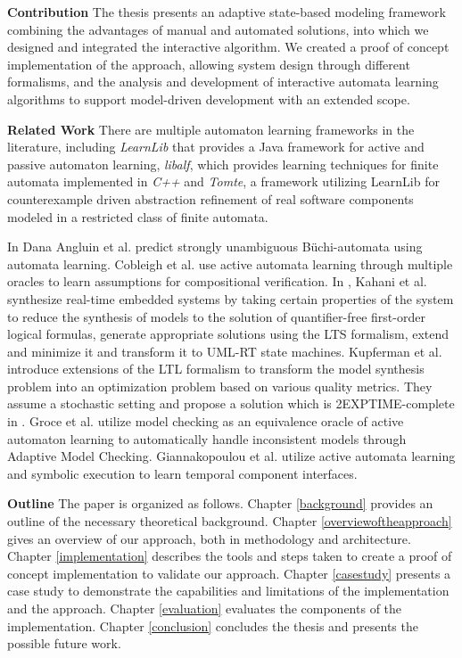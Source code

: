 \textbf{Contribution} The thesis presents an adaptive state-based modeling framework combining the advantages of manual and automated solutions, into which we designed and integrated the interactive algorithm. We created a proof of concept implementation of the approach, allowing system design through different formalisms, and the analysis and development of interactive automata learning algorithms to support model-driven development with an extended scope.
\clearpage

\textbf{Related Work} There are multiple automaton learning frameworks in the literature, including
\emph{LearnLib}\cite{10.1007/978-3-319-21690-4_32} that provides a Java framework for active and passive automaton learning, \emph{libalf}, which provides learning techniques for finite automata implemented in \emph{C++} and \emph{Tomte}\cite{aarts2012automata}, a framework utilizing LearnLib for counterexample driven abstraction refinement of real software components modeled in a restricted class of finite automata.

In \cite{angluin2020strongly} Dana Angluin et al. predict strongly unambiguous Büchi-automata using automata learning. Cobleigh et al. use active automata learning through multiple oracles to learn assumptions for compositional verification\cite{cobleigh2003learning}. 
In \cite{kahaninafiseh}, Kahani et al. synthesize real-time embedded systems by taking certain properties of the system to reduce the synthesis of models to the solution of quantifier-free first-order logical formulas, generate appropriate solutions using the LTS formalism, extend and minimize it and transform it to UML-RT state machines.
Kupferman et al. introduce extensions of the LTL formalism to transform the model synthesis problem into an optimization problem based on various quality metrics. They assume a stochastic setting and propose a solution which is 2EXPTIME-complete in \cite{kupferman}.
Groce et al. utilize model checking as an equivalence oracle of active automaton learning to automatically handle inconsistent models through Adaptive Model Checking\cite{groce2002adaptive}. Giannakopoulou et al. utilize active automata learning and symbolic execution to learn temporal component interfaces\cite{giannakopoulou2012symbolic}.


\textbf{Outline} The paper is organized as follows. Chapter \ref{background} provides an outline of the necessary theoretical background. Chapter \ref{overviewoftheapproach} gives an overview of our approach, both in methodology and architecture. Chapter \ref{implementation} describes the tools and steps taken to create a proof of concept implementation to validate our approach. Chapter \ref{casestudy} presents a case study to demonstrate the capabilities and limitations of the implementation and the approach. Chapter \ref{evaluation} evaluates the components of the implementation. Chapter \ref{conclusion} concludes the thesis and presents the possible future work.




